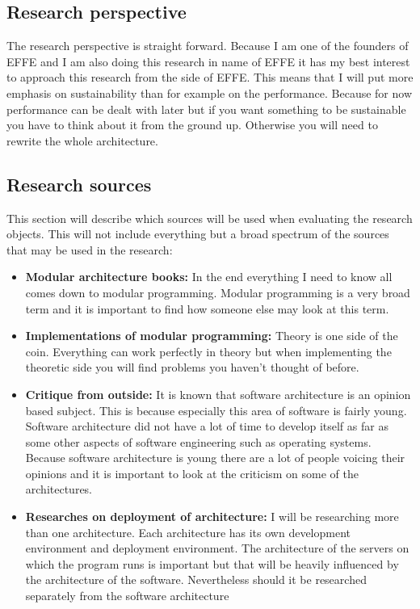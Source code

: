 \subsection{Research perspective}
The research perspective is straight forward. Because I am one of the founders of EFFE and I am also doing this research in name of EFFE it has my best interest to approach this research from the side of EFFE. This means that I will put more emphasis on sustainability than for example on the performance. Because for now performance can be dealt with later but if you want something to be sustainable you have to think about it from the ground up. Otherwise you will need to rewrite the whole architecture.

\subsection{Research sources}
This section will describe which sources will be used when evaluating the research objects. This will not include everything but a broad spectrum of the sources that may be used in the research:

\begin{itemize}
	\item \textbf{Modular architecture books: }In the end everything I need to know all comes down to modular programming. Modular programming is a very broad term and it is important to find how someone else may look at this term.

	\item \textbf{Implementations of modular programming: }Theory is one side of the coin. Everything can work perfectly in theory but when implementing the theoretic side you will find problems you haven't thought of before.

	\item \textbf{Critique from outside: }It is known that software architecture is an opinion based subject. This is because especially this area of software is fairly young. Software architecture did not have a lot of time to develop itself as far as some other aspects of software engineering such as operating systems. Because software architecture is young there are a lot of people voicing their opinions and it is important to look at the criticism on some of the architectures.

	\item \textbf{Researches on deployment of architecture: }I will be researching more than one architecture. Each architecture has its own development environment and deployment environment. The architecture of the servers on which the program runs is important but that will be heavily influenced by the architecture of the software. Nevertheless should it be researched separately from the software architecture
\end{itemize}

